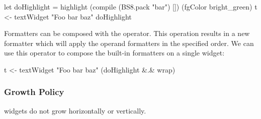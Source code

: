\begin{haskellcode}
 let doHighlight = highlight (compile (BS8.pack "bar") [])
                     (fgColor bright_green)
 t <- textWidget "Foo bar baz" doHighlight
\end{haskellcode}

Formatters can be composed with the  operator.  This
operation results in a new formatter which will apply the operand
formatters in the specified order.  We can use this operator to
compose the built-in formatters on a single  widget:

\begin{haskellcode}
 t <- textWidget "Foo bar baz" (doHighlight \&.\& wrap)
\end{haskellcode}

\subsubsection{Growth Policy}

 widgets do not grow horizontally or vertically.
